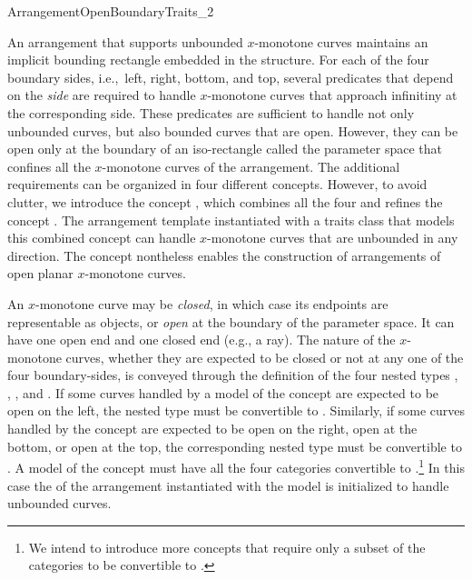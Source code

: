 
\ccRefPageBegin
\begin{ccRefConcept}{ArrangementOpenBoundaryTraits_2}

\ccDefinition
An arrangement that supports unbounded $x$-monotone curves maintains
an implicit bounding rectangle embedded in the \dcel{} structure.
For each of the four boundary sides, i.e.,~left, right, bottom, and
top, several predicates that depend on the \emph{side} are required
to handle $x$-monotone curves that approach infinitiny at the
corresponding side. These predicates are sufficient to handle not
only unbounded curves, but also bounded curves that are open.
However, they can be open only at the boundary of an iso-rectangle
called the parameter space that confines all the $x$-monotone curves
of the arrangement. The additional requirements can be organized in
four different concepts. However, to avoid clutter, we introduce the
concept \ccRefName, which combines all the four and refines the
concept . The arrangement template
instantiated with a traits class that models this combined concept
can handle $x$-monotone curves that are unbounded in any direction.
The concept \ccRefName{} nontheless enables the construction of
arrangements of open planar $x$-monotone curves. 

An $x$-monotone curve may be \emph{closed}, in which case its endpoints
are representable as  objects, or \emph{open} at the
boundary of the parameter space. It can have one open end and one
closed end (e.g., a ray). The nature of the $x$-monotone curves,
whether they are expected to be closed or not at any one of the four
boundary-sides, is conveyed through the definition of the four nested
types , ,
, and . If some curves
handled by a model of the concept \ccRefName{} are expected to be open
on the left, the nested type  must be convertible
to . Similarly, if some curves handled by the
concept are expected to be open on the right, open at the bottom, or
open at the top, the corresponding nested type must be convertible to
. A model of the concept \ccRefName{} must have
all the four categories convertible to
.\footnote{We intend to introduce more concepts
that require only a subset of the categories to be convertible to
.} In this case the \dcel{} of the arrangement
instantiated with the model is initialized to handle unbounded curves.


\end{ccRefConcept}
